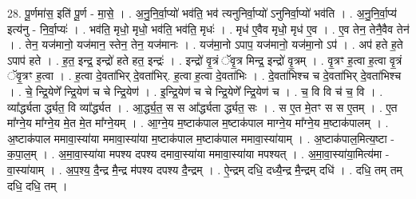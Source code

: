 \documentclass[17pt]{extarticle}
\begin{document}
28. पू॒र्णमा॑स॒ इति॑ पू॒र्ण - मा॒से॒ । . अ॒नु॒नि॒र्वा॒प्यो॑ भव॑ति॒ भव॑ त्यनुनिर्वा॒प्यो॑ ऽनुनिर्वा॒प्यो॑ भव॑ति । . अ॒नु॒नि॒र्वा॒प्य॑ इत्य॑नु - नि॒र्वा॒प्यः॑ । . भव॑ति॒ मृधो॒ मृधो॒ भव॑ति॒ भव॑ति॒ मृधः॑ । . मृध॑ ए॒वैव मृधो॒ मृध॑ ए॒व । . ए॒व तेन॒ तेनै॒वैव तेन॑ । . तेन॒ यज॑मानो॒ यज॑मान॒ स्तेन॒ तेन॒ यज॑मानः । . यज॑मा॒नो ऽपाप॒ यज॑मानो॒ यज॑मा॒नो ऽप॑ । . अप॑ हते ह॒ते ऽपाप॑ हते । . ह॒त॒ इन्द्र॒ इन्द्रो॑ हते हत॒ इन्द्रः॑ । . इन्द्रो॑ वृ॒त्रं ॅवृ॒त्र मिन्द्र॒ इन्द्रो॑ वृ॒त्रम् । . वृ॒त्रꣳ ह॒त्वा ह॒त्वा वृ॒त्रं ॅवृ॒त्रꣳ ह॒त्वा । . ह॒त्वा दे॒वता॑भिर् दे॒वता॑भिर्. ह॒त्वा ह॒त्वा दे॒वता॑भिः । . दे॒वता॑भिश्च च दे॒वता॑भिर् दे॒वता॑भिश्च । . चे॒ न्द्रि॒येणे᳚ न्द्रि॒येण॑ च चे न्द्रि॒येण॑ । . इ॒न्द्रि॒येण॑ च चे न्द्रि॒येणे᳚ न्द्रि॒येण॑ च । . च॒ वि वि च॑ च॒ वि । . व्या᳚र्द्ध्यता र्द्ध्यत॒ वि व्या᳚र्द्ध्यत । . आ॒र्द्ध्य॒त॒ स स आ᳚र्द्ध्यता र्द्ध्यत॒ सः । . स ए॒त मे॒तꣳ स स ए॒तम् । . ए॒त मा᳚ग्ने॒य मा᳚ग्ने॒य मे॒त मे॒त मा᳚ग्ने॒यम् । . आ॒ग्ने॒य म॒ष्टाक॑पाल म॒ष्टाक॑पाल माग्ने॒य मा᳚ग्ने॒य म॒ष्टाक॑पालम् । . अ॒ष्टाक॑पाल ममावा॒स्या॑या ममावा॒स्या॑या म॒ष्टाक॑पाल म॒ष्टाक॑पाल ममावा॒स्या॑याम् । . अ॒ष्टाक॑पाल॒मित्य॒ष्टा - क॒पा॒ल॒म् । . अ॒मा॒वा॒स्या॑या मपश्य दपश्य दमावा॒स्या॑या ममावा॒स्या॑या मपश्यत् । . अ॒मा॒वा॒स्या॑या॒मित्य॑मा - वा॒स्या॑याम् । . अ॒प॒श्य॒ दै॒न्द्र मै॒न्द्र म॑पश्य दपश्य दै॒न्द्रम् । . ऐ॒न्द्रम् दधि॒ दध्यै॒न्द्र मै॒न्द्रम् दधि॑ । . दधि॒ तम् तम् दधि॒ दधि॒ तम् । \newline
\end{document}
